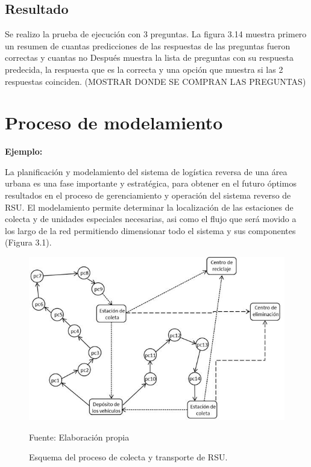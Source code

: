 \subsection{Resultado}

Se realizo la prueba de ejecución con 3 preguntas. La figura 3.14 muestra primero un resumen de cuantas predicciones de las respuestas de las preguntas fueron correctas y cuantas no Después muestra la lista de preguntas con su respuesta predecida, la respuesta que es la correcta y una opción que muestra si las 2 respuestas coinciden.
(MOSTRAR DONDE SE COMPRAN LAS PREGUNTAS)





















\section{Proceso de modelamiento} 

{\bf Ejemplo:}\par

La planificación y modelamiento del sistema de logística reversa de una área urbana es una fase importante y estratégica, para obtener en el futuro óptimos resultados en el proceso de gerenciamiento y operación del sistema reverso de RSU. El modelamiento permite determinar la localización de las estaciones de colecta y de unidades especiales necesarias, asi como el flujo que será movido a los largo de la red permitiendo dimensionar todo el sistema y sus componentes (Figura 3.1).
\vskip 0.3cm
\begin{figure}[ht]
\begin{center}
\includegraphics[width=.6\textwidth]{Figura3}
\end{center}
\begin{center}
\vskip -0.5cm
\caption{\small{Esquema del proceso de colecta y transporte de RSU.}}
{\small{Fuente: Elaboración propia}}
\end{center}
\end{figure}

